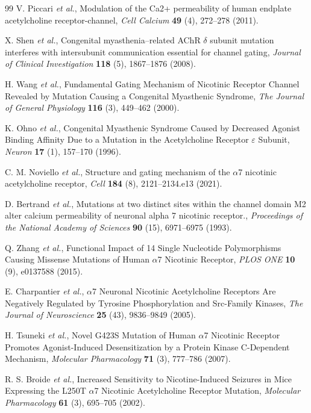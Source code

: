 \documentclass{ws-procs11x85}
\begin{document}
\begin{thebibliography}{99}
V. Piccari {\em et al.}, Modulation of the Ca2+ permeability of human endplate acetylcholine receptor-channel, {\em Cell Calcium} {\bf 49} (4), 272--278 (2011).

X. Shen {\em et al.}, Congenital myasthenia--related AChR $\delta$ subunit mutation interferes with intersubunit communication essential for channel gating, {\em Journal of Clinical Investigation} {\bf 118} (5), 1867--1876 (2008).

H. Wang {\em et al.}, Fundamental Gating Mechanism of Nicotinic Receptor Channel Revealed by Mutation Causing a Congenital Myasthenic Syndrome, {\em The Journal of General Physiology} {\bf 116} (3), 449--462 (2000).

K. Ohno {\em et al.}, Congenital Myasthenic Syndrome Caused by Decreased Agonist Binding Affinity Due to a Mutation in the Acetylcholine Receptor $\varepsilon$ Subunit, {\em Neuron} {\bf 17} (1), 157--170 (1996).

C. M. Noviello {\em et al.}, Structure and gating mechanism of the $\alpha$7 nicotinic acetylcholine receptor, {\em Cell} {\bf 184} (8), 2121--2134.e13 (2021).

D. Bertrand {\em et al.}, Mutations at two distinct sites within the channel domain M2 alter calcium permeability of neuronal alpha 7 nicotinic receptor., {\em Proceedings of the National Academy of Sciences} {\bf 90} (15), 6971--6975 (1993).

Q. Zhang {\em et al.}, Functional Impact of 14 Single Nucleotide Polymorphisms Causing Missense Mutations of Human $\alpha$7 Nicotinic Receptor, {\em PLOS ONE} {\bf 10} (9), e0137588 (2015).

E. Charpantier {\em et al.}, $\alpha$7 Neuronal Nicotinic Acetylcholine Receptors Are Negatively Regulated by Tyrosine Phosphorylation and Src-Family Kinases, {\em The Journal of Neuroscience} {\bf 25} (43), 9836--9849 (2005).

H. Tsuneki {\em et al.}, Novel G423S Mutation of Human $\alpha$7 Nicotinic Receptor Promotes Agonist-Induced Desensitization by a Protein Kinase C-Dependent Mechanism, {\em Molecular Pharmacology} {\bf 71} (3), 777--786 (2007).

R. S. Broide {\em et al.}, Increased Sensitivity to Nicotine-Induced Seizures in Mice Expressing the L250T $\alpha$7 Nicotinic Acetylcholine Receptor Mutation, {\em Molecular Pharmacology} {\bf 61} (3), 695--705 (2002).


\end{thebibliography}
\end{document}
